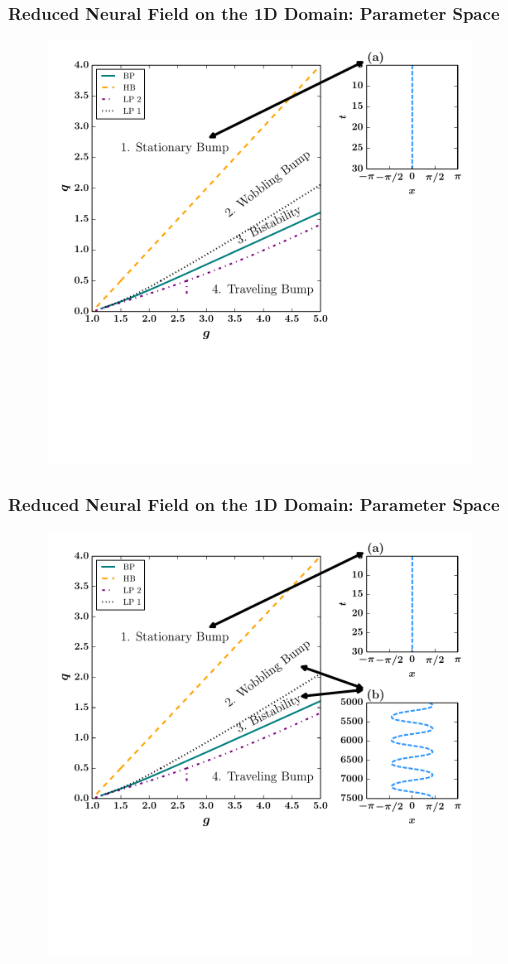\documentclass{beamer}
\begin{document}
\begin{frame}
\frametitle{Reduced Neural Field on the 1D Domain: Parameter Space}
\begin{figure}
 \includegraphics[width=.6\textwidth]{oned_phase_2par1.pdf}
\end{figure}
\end{frame}


\begin{frame}
\frametitle{Reduced Neural Field on the 1D Domain: Parameter Space}
\begin{figure}
 \includegraphics[width=.6\textwidth]{oned_phase_2par2.pdf}
\end{figure}
\end{frame}
\end{document}
